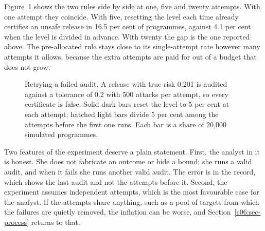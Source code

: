 Figure~\ref{c06:fig-retry} shows the two rules side by side at one, five and twenty
attempts. With one attempt they coincide. With five, resetting the level each time
already certifies an unsafe release in 16.5 per cent of programmes, against 4.1
per cent when the level is divided in advance. With twenty the gap is the one
reported above. The pre-allocated rule stays close to its single-attempt rate
however many attempts it allows, because the extra attempts are paid for out of a
budget that does not grow.

\begin{figure}[ht]
\centering
{}
\caption{Retrying a failed audit. A release with true risk 0.201 is audited against
a tolerance of 0.2 with 500 attacks per attempt, so every certificate is false.
Solid dark bars reset the level to 5 per cent at each attempt; hatched light bars
divide 5 per cent among the attempts before the first one runs. Each bar is a share
of 20,000 simulated programmes.}
\label{c06:fig-retry}
\end{figure}

Two features of the experiment deserve a plain statement. First, the analyst in it
is honest. She does not fabricate an outcome or hide a bound; she runs a valid audit,
and when it fails she runs another valid audit. The error is in the record, which
shows the last audit and not the attempts before it. Second, the experiment
assumes independent attempts, which is the most favourable case for the analyst.
If the attempts share anything, such as a pool of targets from which the failures
are quietly removed, the inflation can be worse, and Section~\ref{c06:sec-process}
returns to that.

